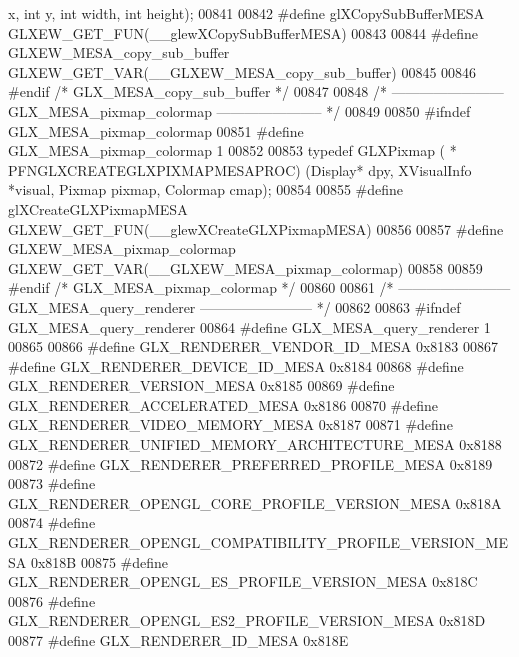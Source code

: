 \begin{DoxyCode}
      x, \textcolor{keywordtype}{int} y, \textcolor{keywordtype}{int} width, \textcolor{keywordtype}{int} height);
00841 
00842 \textcolor{preprocessor}{#define glXCopySubBufferMESA GLXEW\_GET\_FUN(\_\_glewXCopySubBufferMESA)}
00843 
00844 \textcolor{preprocessor}{#define GLXEW\_MESA\_copy\_sub\_buffer GLXEW\_GET\_VAR(\_\_GLXEW\_MESA\_copy\_sub\_buffer)}
00845 
00846 \textcolor{preprocessor}{#endif }\textcolor{comment}{/* GLX\_MESA\_copy\_sub\_buffer */}\textcolor{preprocessor}{}
00847 
00848 \textcolor{comment}{/* ------------------------ GLX\_MESA\_pixmap\_colormap ----------------------- */}
00849 
00850 \textcolor{preprocessor}{#ifndef GLX\_MESA\_pixmap\_colormap}
00851 \textcolor{preprocessor}{#define GLX\_MESA\_pixmap\_colormap 1}
00852 
00853 \textcolor{keyword}{typedef} GLXPixmap ( * PFNGLXCREATEGLXPIXMAPMESAPROC) (Display* dpy, XVisualInfo *visual, Pixmap pixmap, 
      Colormap cmap);
00854 
00855 \textcolor{preprocessor}{#define glXCreateGLXPixmapMESA GLXEW\_GET\_FUN(\_\_glewXCreateGLXPixmapMESA)}
00856 
00857 \textcolor{preprocessor}{#define GLXEW\_MESA\_pixmap\_colormap GLXEW\_GET\_VAR(\_\_GLXEW\_MESA\_pixmap\_colormap)}
00858 
00859 \textcolor{preprocessor}{#endif }\textcolor{comment}{/* GLX\_MESA\_pixmap\_colormap */}\textcolor{preprocessor}{}
00860 
00861 \textcolor{comment}{/* ------------------------ GLX\_MESA\_query\_renderer ------------------------ */}
00862 
00863 \textcolor{preprocessor}{#ifndef GLX\_MESA\_query\_renderer}
00864 \textcolor{preprocessor}{#define GLX\_MESA\_query\_renderer 1}
00865 
00866 \textcolor{preprocessor}{#define GLX\_RENDERER\_VENDOR\_ID\_MESA 0x8183}
00867 \textcolor{preprocessor}{#define GLX\_RENDERER\_DEVICE\_ID\_MESA 0x8184}
00868 \textcolor{preprocessor}{#define GLX\_RENDERER\_VERSION\_MESA 0x8185}
00869 \textcolor{preprocessor}{#define GLX\_RENDERER\_ACCELERATED\_MESA 0x8186}
00870 \textcolor{preprocessor}{#define GLX\_RENDERER\_VIDEO\_MEMORY\_MESA 0x8187}
00871 \textcolor{preprocessor}{#define GLX\_RENDERER\_UNIFIED\_MEMORY\_ARCHITECTURE\_MESA 0x8188}
00872 \textcolor{preprocessor}{#define GLX\_RENDERER\_PREFERRED\_PROFILE\_MESA 0x8189}
00873 \textcolor{preprocessor}{#define GLX\_RENDERER\_OPENGL\_CORE\_PROFILE\_VERSION\_MESA 0x818A}
00874 \textcolor{preprocessor}{#define GLX\_RENDERER\_OPENGL\_COMPATIBILITY\_PROFILE\_VERSION\_MESA 0x818B}
00875 \textcolor{preprocessor}{#define GLX\_RENDERER\_OPENGL\_ES\_PROFILE\_VERSION\_MESA 0x818C}
00876 \textcolor{preprocessor}{#define GLX\_RENDERER\_OPENGL\_ES2\_PROFILE\_VERSION\_MESA 0x818D}
00877 \textcolor{preprocessor}{#define GLX\_RENDERER\_ID\_MESA 0x818E}

\end{DoxyCode}
